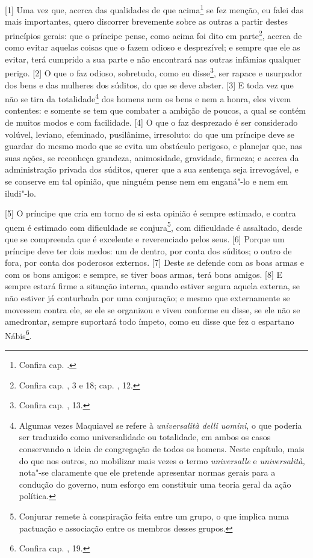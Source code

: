 {[}1{]} Uma vez que, acerca das qualidades de que acima\footnote{Confira
  cap. .} se fez menção, eu falei das mais importantes, quero
discorrer brevemente sobre as outras a partir destes princípios gerais:
que o príncipe pense, como acima foi dito em parte\footnote{Confira cap.
  , 3 e 18; cap. , 12.}, acerca de como evitar aquelas coisas que
o fazem odioso e desprezível; e sempre que ele as evitar, terá cumprido
a sua parte e não encontrará nas outras infâmias qualquer perigo.
{[}2{]} O que o faz odioso, sobretudo, como eu disse\footnote{Confira
  cap. , 13.}, ser rapace e usurpador dos bens e das mulheres dos
súditos, do que se deve abster. {[}3{]} E toda vez que não se tira da
totalidade\footnote{Algumas vezes Maquiavel se refere à
  \emph{universalità delli uomini}, o que poderia ser traduzido como
  universalidade ou totalidade, em ambos os casos conservando a ideia de
  congregação de todos os homens. Neste capítulo, mais do que nos
  outros, ao mobilizar mais vezes o termo \emph{universalle} e
  \emph{universalità,} nota"-se claramente que ele pretende apresentar
  normas gerais para a condução do governo, num esforço em constituir
  uma teoria geral da ação política.} dos homens nem os bens e nem a
honra, eles vivem contentes: e somente se tem que combater a ambição de
poucos, a qual se contém de muitos modos e com facilidade. {[}4{]} O que
o faz desprezado é ser considerado volúvel, leviano, efeminado,
pusilânime, irresoluto: do que um príncipe deve se guardar do mesmo modo
que se evita um obstáculo perigoso, e planejar que, nas suas ações, se
reconheça grandeza, animosidade, gravidade, firmeza; e acerca da
administração privada dos súditos, querer que a sua sentença seja
irrevogável, e se conserve em tal opinião, que ninguém pense nem em
enganá"-lo e nem em iludi"-lo.

{[}5{]} O príncipe que cria em torno de si esta opinião é sempre
estimado, e contra quem é estimado com dificuldade se conjura\footnote{Conjurar
  remete à conspiração feita entre um grupo, o que implica numa
  pactuação e associação entre os membros desses grupos.}, com
dificuldade é assaltado, desde que se compreenda que é excelente e
reverenciado pelos seus. {[}6{]} Porque um príncipe deve ter dois medos:
um de dentro, por conta dos súditos; o outro de fora, por conta dos
poderosos externos. {[}7{]} Deste se defende com as boas armas e com os
bons amigos: e sempre, se tiver boas armas, terá bons amigos. {[}8{]} E
sempre estará firme a situação interna, quando estiver segura aquela
externa, se não estiver já conturbada por uma conjuração; e mesmo que
externamente se movessem contra ele, se ele se organizou e viveu
conforme eu disse, se ele não se amedrontar, sempre suportará todo
ímpeto, como eu disse que fez o espartano Nábis\footnote{Confira cap.
  , 19.}.

